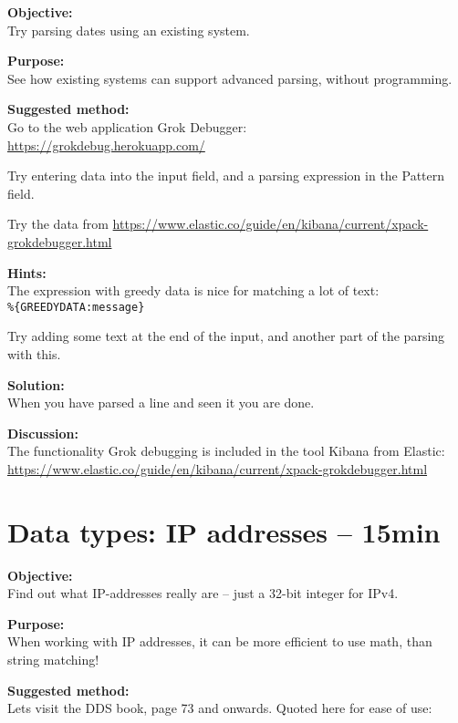 \documentclass[a4paper,11pt,notitlepage]{report}
\begin{document}

{\bf Objective:}\\
Try parsing dates using an existing system.

{\bf Purpose:}\\
See how existing systems can support advanced parsing, without programming.

{\bf Suggested method:}\\
Go to the web application Grok Debugger:\\
\url{https://grokdebug.herokuapp.com/}

Try entering data into the input field, and a parsing expression in the Pattern field.

Try the data from
\url{https://www.elastic.co/guide/en/kibana/current/xpack-grokdebugger.html}



{\bf Hints:}\\
The expression with greedy data is nice for matching a lot of text:\\
\verb+%{GREEDYDATA:message}+

Try adding some text at the end of the input, and another part of the parsing with this.

{\bf Solution:}\\
When you have parsed a line and seen it you are done.

{\bf Discussion:}\\
The functionality Grok debugging is included in the tool Kibana from Elastic:\\
\url{https://www.elastic.co/guide/en/kibana/current/xpack-grokdebugger.html}





\chapter{Data types: IP addresses -- 15min}
\label{ex:data-types-ip-address}

{\bf Objective:}\\
Find out what IP-addresses really are -- just a 32-bit integer for IPv4.


{\bf Purpose:}\\
When working with IP addresses, it can be more efficient to use math, than string matching!


{\bf Suggested method:}\\
Lets visit the DDS book, page 73 and onwards. Quoted here for ease of use:
\end{document}
